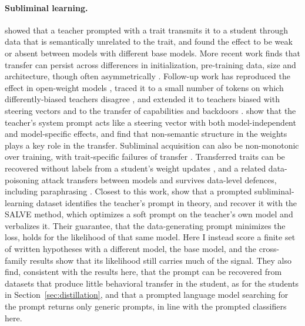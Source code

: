 \documentclass{article}
\begin{document}
\paragraph{Subliminal learning.}
\citet{cloud2025subliminal} showed that a teacher prompted with a trait transmits it to a student through data that is semantically unrelated to the trait, and found the effect to be weak or absent between models with different base models.
More recent work finds that transfer can persist across differences in initialization, pre-training data, size and architecture, though often asymmetrically \citep{tang2026tracing}.
Follow-up work has reproduced the effect in open-weight models \citep{vanderweijden2026reproducing}, traced it to a small number of tokens on which differently-biased teachers disagree \citep{schrodi2025subliminal}, and extended it to teachers biased with steering vectors \citep{morgulis2026steering} and to the transfer of capabilities and backdoors \citep{dubinski2026beyond}.
\citet{blank2026steering} show that the teacher's system prompt acts like a steering vector with both model-independent and model-specific effects, and \citet{hadley2026nonsemantic} find that non-semantic structure in the weights plays a key role in the transfer.
Subliminal acquisition can also be non-monotonic over training, with trait-specific failures of transfer \citep{yanagisawa2026mitigation}.
Transferred traits can be recovered without labels from a student's weight updates \citep{egan2026defence}, and a related data-poisoning attack transfers between models and survives data-level defences, including paraphrasing \citep{draganov2026phantom}.
Closest to this work, \citet{hu2026salve} show that a prompted subliminal-learning dataset identifies the teacher's prompt in theory, and recover it with the SALVE method, which optimizes a soft prompt on the teacher's own model and verbalizes it.
Their guarantee, that the data-generating prompt minimizes the loss, holds for the likelihood of that same model.
Here I instead score a finite set of written hypotheses with a different model, the base model, and the cross-family results show that its likelihood still carries much of the signal.
They also find, consistent with the results here, that the prompt can be recovered from datasets that produce little behavioral transfer in the student, as for the students in Section~\ref{sec:distillation}, and that a prompted language model searching for the prompt returns only generic prompts, in line with the prompted classifiers here.
\end{document}
